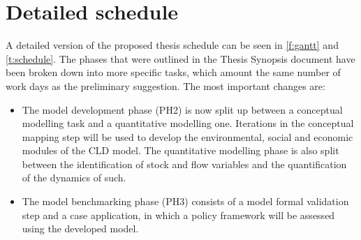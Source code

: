 \documentclass[a4paper,fontsize=11pt,bibliography=totoc]{scrartcl}
\begin{document}
\section{Detailed schedule}
A detailed version of the proposed thesis schedule can be seen in \autoref{f:gantt} and \autoref{t:schedule}. The phases that were outlined in the Thesis Synopsis document have been broken down into more specific tasks, which amount the same number of work days as the preliminary suggestion. The most important changes are:
%
\begin{itemize}
\item The model development phase (PH2) is now split up between a conceptual modelling task and a quantitative modelling one. Iterations in the conceptual mapping step will be used to develop the environmental, social and economic modules of the CLD model. The quantitative modelling phase is also split between the identification of stock and flow variables and the quantification of the dynamics of such.
\item The model benchmarking phase (PH3) consists of a model formal validation step and a case application, in which a policy framework will be assessed using the developed model.
\end{itemize}
\end{document}
